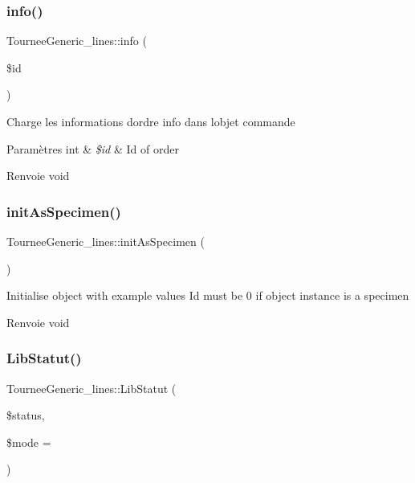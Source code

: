 \subsubsection{\texorpdfstring{info()}{info()}}
{\footnotesize\ttfamily Tournee\+Generic\+\_\+lines\+::info (\begin{DoxyParamCaption}\item[{}]{\$id }\end{DoxyParamCaption})}

Charge les informations d\textquotesingle{}ordre info dans l\textquotesingle{}objet commande


\begin{DoxyParams}[1]{Paramètres}
int & {\em \$id} & Id of order \\
\hline
\end{DoxyParams}
\begin{DoxyReturn}{Renvoie}
void 
\end{DoxyReturn}
\mbox{\label{classTourneeGeneric__lines_a0acc06c36a88f739608ff2f76000ea9f}} 
\subsubsection{\texorpdfstring{init\+As\+Specimen()}{initAsSpecimen()}}
{\footnotesize\ttfamily Tournee\+Generic\+\_\+lines\+::init\+As\+Specimen (\begin{DoxyParamCaption}{ }\end{DoxyParamCaption})}

Initialise object with example values Id must be 0 if object instance is a specimen

\begin{DoxyReturn}{Renvoie}
void 
\end{DoxyReturn}
\mbox{\label{classTourneeGeneric__lines_abe9a6dd0151821840baf7eed020835ce}} 
\subsubsection{\texorpdfstring{Lib\+Statut()}{LibStatut()}}
{\footnotesize\ttfamily Tournee\+Generic\+\_\+lines\+::\+Lib\+Statut (\begin{DoxyParamCaption}\item[{}]{\$status,  }\item[{}]{\$mode = {} }\end{DoxyParamCaption})}


